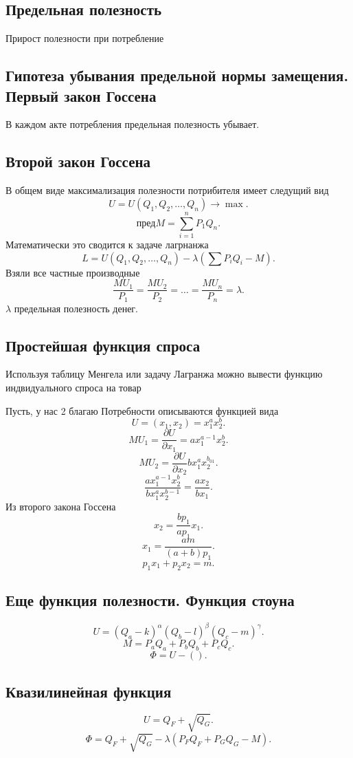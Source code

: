 \documentclass[14pt]{extarticle}
\begin{document}
\subsection{Предельная полезность}
Прирост полезности при потребление
\subsection{Гипотеза убывания предельной нормы замещения. Первый закон Госсена}
В каждом акте потребления предельная полезность убывает.
\subsection{Второй закон Госсена}
В общем виде максимализация полезности потрибителя имеет следущий вид
\[
	U = U(Q_1,Q_2,\dots,Q_{n}) \to \max
	.\]
\[
	\text{пред} M = \sum_{i=1}^{n} P_1 Q_{n}
	.\]
Математически это сводится к задаче лагрнанжа
\[
	L = U(Q_1,Q_2,\dots,Q_{n}) - \lambda(\sum P_{i} Q_{i} - M)
	.\]
Взяли все частные производные
\[
	\frac{M U_1}{P_1} = \frac{M U_2}{P_{2}} = \dots = \frac{M U_{n}}{P_{n}}  = \lambda
	.\]
$\lambda$ предельная полезность денег.
\subsection{Простейшая функция спроса}
Используя таблицу Менгела или задачу Лагранжа можно вывести функцию индвидуального спроса на товар

Пусть, у нас 2 благаю Потребности описываются функцией вида
\[
	U = (x_1,x_2) = x_1^{a} x_2^{b}
	.\]
\[
	M U_1 = \frac{\partial U}{\partial x_1} = ax_1^{a -1} x_2^{b}
	.\]
\[
	M U_2 = \frac{\partial U}{\partial x_2} bx_1^{a} x_2^{b_{01}}
	.\]
\[
	\frac{ax_1^{a-1} x_2^{b}}{bx_1^{a} x_2^{b -1}} = \frac{ax_2}{bx_1}
	.\]
Из второго закона Госсена
\[
	x_2 = \frac{b p_1}{a p_1} x_1
	.\]
\[
	x_1 = \frac{a m}{(a + b) p_1}
	.\]
\[
	p_1 x_1 + p_2 x_2 = m
	.\]
\subsection{Еще функция полезности. Функция стоуна}
\[
	U = (Q_{a} - k)^{\alpha} (Q_{b} - l)^{\beta} (Q_{c} - m)^{\gamma}
	.\]
\[
	M = P_{a} Q_{a} + P_{b} Q_{b} + P_{c} Q_{c}
	.\]
\[
	\Phi = U - ()
	.\]
\subsection{Квазилинейная функция}
\[
	U = Q_{F} + \sqrt{Q_{G}}
	.\]
\[
	\Phi = Q_{F} + \sqrt{Q_{G}} - \lambda (P_{F} Q_{F} + P_{G} Q_{G}  - M)
	.\]
\end{document}
